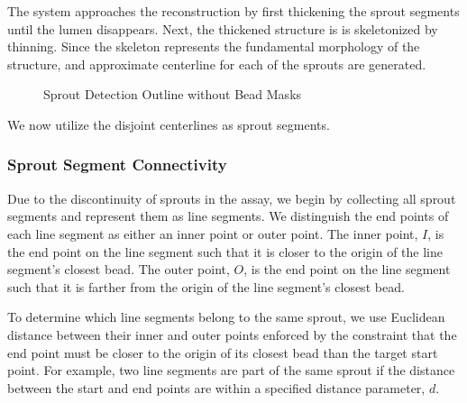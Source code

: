 \documentclass{sig-alternate}
\begin{document}
		The system approaches the reconstruction by first thickening the
		sprout segments until the lumen disappears. Next, the thickened
		structure is is skeletonized by thinning. Since the skeleton
		represents the fundamental morphology of the structure, and
		approximate centerline for each of the sprouts are generated.
		\begin{figure}[htp!]
			\centering
			\caption{Sprout Detection Outline without Bead Masks}
			\label{fig:sproutex}
		\end{figure}
		We now utilize the disjoint centerlines as sprout segments.
		
		\subsubsection{Sprout Segment Connectivity} %
		\label{ssub:Sprout Segment Connectivity}
			Due to the discontinuity of sprouts in the assay, we begin by
			collecting all sprout segments and represent them as line
			segments. We distinguish the end points of each line segment
			as either an inner point or outer point. The inner point, $I$,
			is the end point on the line segment such that it is closer to
			the origin of the line segment's closest bead. The outer
			point, $O$, is the end point on the line segment such that it
			is farther from the origin of the line segment's closest bead.

			To determine which line segments belong to the same sprout, we
			use Euclidean distance between their inner and outer points
			enforced by the constraint that the end point must be closer
			to the origin of its closest bead than the target start point.
			For example, two line segments are part of the same sprout if
			the distance between the start and end points are within a
			specified distance parameter, $d$.
\end{document}

